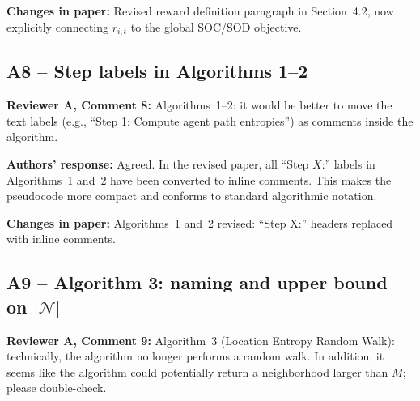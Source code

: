 \documentclass[review]{jair}
\begin{document}
\begin{changebox}
\textbf{Changes in paper:} Revised reward definition paragraph in Section~4.2, now explicitly connecting $r_{i,t}$ to the global SOC/SOD objective.
\end{changebox}

\subsection*{A8 -- Step labels in Algorithms 1--2}

\begin{reviewerbox}
\textbf{Reviewer A, Comment 8:} Algorithms~1--2: it would be better to move the text labels (e.g., ``Step 1: Compute agent path entropies'') as comments inside the algorithm.
\end{reviewerbox}

\begin{authorbox}
\textbf{Authors' response:} Agreed. In the revised paper, all ``Step $X$:'' labels in Algorithms~1 and~2 have been converted to inline comments. This makes the pseudocode more compact and conforms to standard algorithmic notation.
\end{authorbox}

\begin{changebox}
\textbf{Changes in paper:} Algorithms~1 and~2 revised: ``Step X:'' headers replaced with inline comments.
\end{changebox}

\subsection*{A9 -- Algorithm 3: naming and upper bound on $|\mathcal{N}|$}

\begin{reviewerbox}
\textbf{Reviewer A, Comment 9:} Algorithm~3 (Location Entropy Random Walk): technically, the algorithm no longer performs a random walk. In addition, it seems like the algorithm could potentially return a neighborhood larger than $M$; please double-check.
\end{reviewerbox}
\end{document}
